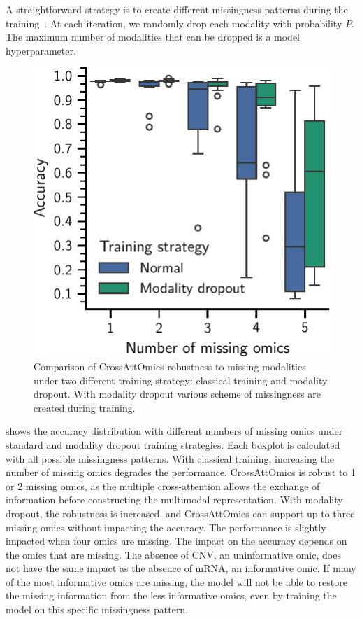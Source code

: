 \documentclass[../main.tex]{subfiles}
\begin{document}
		A straightforward strategy is to create different missingness patterns during the training~\cite{Cheerla2019}.
		At each iteration, we randomly drop each modality with probability \(P\).
		The maximum number of modalities that can be dropped is a model hyperparameter.

		\begin{figure}
			\centering
			\vspace{-0.8\intextsep}
			\includegraphics{robustness_missing_modalities_dropout.pdf}
			\caption[CrossAttOmics robustness to missing modalities]{Comparison of CrossAttOmics robustness to missing modalities under two different training strategy: classical training and modality dropout. With modality dropout various scheme of missingness are created during training.}\label{fig:modality_dropout}
		\end{figure}
		 shows the accuracy distribution with different numbers of missing omics under standard and modality dropout training strategies.
		Each boxplot is calculated with all possible missingness patterns.
		With classical training, increasing the number of missing omics degrades the performance.
		CrossAttOmics is robust to 1 or 2 missing omics, as the multiple cross-attention allows the exchange of information before constructing the multimodal representation.
		With modality dropout, the robustness is increased, and CrossAttOmics can support up to three missing omics without impacting the accuracy.
		The performance is slightly impacted when four omics are missing.
		The impact on the accuracy depends on the omics that are missing.
		The absence of CNV, an uninformative omic, does not have the same impact as the absence of mRNA, an informative omic.
		If many of the most informative omics are missing, the model will not be able to restore the missing information from the less informative omics, even by training the model on this specific missingness pattern.
\end{document}

